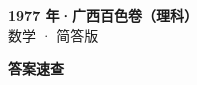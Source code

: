 \documentclass[zihao=-4, a4paper]{ctexart}
\begin{document}
\begin{center}
  {\Large\bfseries 1977 年·广西百色卷（理科）}\\[4pt]
  {\large 数学 · 简答版}
\end{center}
\medskip
{}

\clearpage
{}
\begin{center}{\Large\bfseries 答案速查}\end{center}
\medskip

\end{document}
